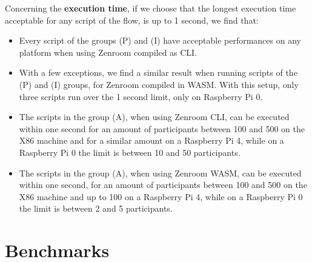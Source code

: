 \documentclass[twocolumn]{article}
\begin{document}
Concerning the \textbf{execution time}, if we choose that the longest execution time acceptable for any script of the flow, is up to 1 second, we find that: 

\begin{itemize}
\item Every script of the groups (P) and (I) have acceptable performances on any platform when using Zenroom compiled as CLI. 

\item With a few exceptions, we find a similar result when running scripts of the  (P) and (I) groups, for Zenroom compiled in WASM. With this setup, only three scripts run over the 1 second limit, only on Raspberry Pi 0.
 
\item The scripts in the group (A), when using Zenroom CLI, can be executed within one second for an amount of participants between 100 and 500 on the X86 machine and for a similar amount on a Raspberry Pi 4, while on a Raspberry Pi 0 the limit is between 10 and 50 participants. 

\item The scripts in the group (A), when using Zenroom WASM, can be executed within one second, for an amount of participants between 100 and 500 on the X86 machine and up to 100 on a Raspberry Pi 4, while on a Raspberry Pi 0 the limit is between 2 and 5 participants. 

\end{itemize}





\onecolumn

\section{Benchmarks}
\label{sec:benchmarks}
\end{document}
